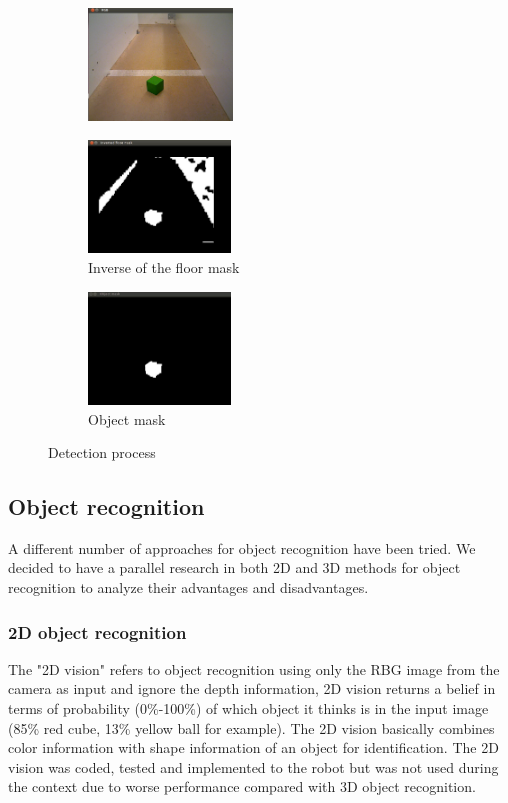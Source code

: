 \begin{figure}[h]
        \centering
        \begin{subfigure}[b]{0.3\linewidth}
                \includegraphics[height=3cm]{figures/RGB.png}
        \end{subfigure}
        \begin{subfigure}[b]{0.3\linewidth}
                \includegraphics[height=3cm]{figures/no_floor_mask.jpg}
                \caption{Inverse of the floor mask}
        \end{subfigure}
        \begin{subfigure}[b]{0.3\linewidth}
                \includegraphics[height=3cm]{figures/object_mask.jpg}
                \caption{Object mask}
        \end{subfigure}
        \caption{Detection process}
        \label{fig:detection}
\end{figure}

\subsection{Object recognition}
A different number of approaches for object recognition have been tried. We decided to have a parallel research in both 2D and 3D methods for object recognition to analyze their advantages and disadvantages. 

\subsubsection{2D object recognition}
The "2D vision" refers to object recognition using only the RBG image from the camera as input and ignore the depth information, 2D vision returns a belief in terms of probability (0\%-100\%) of which object it thinks is in the input image (85\% red cube, 13\% yellow ball for example). The 2D vision basically combines color information with shape information of an object for identification. The 2D vision was coded, tested and implemented to the robot but was not used during the context due to worse performance compared with 3D object recognition.

